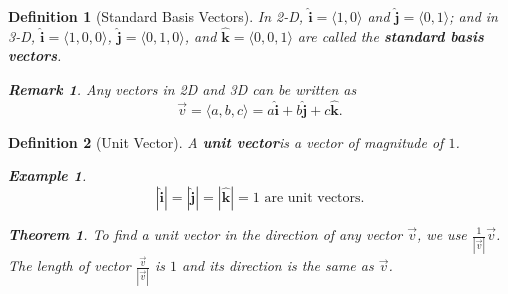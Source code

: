 \documentclass[12pt,a4paper]{article}
\newtheorem{thm}{Theorem}[subsection]
\newtheorem{df}{Definition}[subsection]
\newtheorem{eg}{Example}[subsection]
\newtheorem*{rmk}{\indent Remark}
\def\vecv{\vec{v}}
\def\veci{\hat{\boldsymbol{\textbf{i}}}}
\def\vecj{\hat{\boldsymbol{\textbf{j}}}}
\def\veck{\hat{\boldsymbol{\textbf{k}}}}
\begin{document}
\begin{df}[Standard Basis Vectors]
	In 2-D, $\veci=\langle 1,0\rangle$ and $\vecj=\langle0,1\rangle$; and in 3-D, $\veci=\langle1,0,0\rangle$, $\vecj=\langle0,1,0\rangle$, and $\veck=\langle0,0,1\rangle$ are called the \textbf{standard basis vectors}. 
	\begin{rmk} Any vectors in 2D and 3D can be written as \[\vecv=\langle a,b,c\rangle=a\veci+b\vecj+c\veck.\]\end{rmk}
\end{df}
\begin{df}[Unit Vector]
	A \textbf{unit vector}is a vector of magnitude of $1$. 
	\begin{eg} \[|\veci|=|\vecj|=|\veck|=1\text{ are unit vectors.}\]\end{eg}
	\begin{thm}
		To find a unit vector in the direction of any vector $\vecv$, we use $\displaystyle\frac{1}{|\vecv|}\vecv$. The length of vector $\displaystyle\frac{\vecv}{|\vecv|}$ is $1$ and its direction is the same as $\vecv$.	
	\end{thm}
\end{df}
\end{document}
